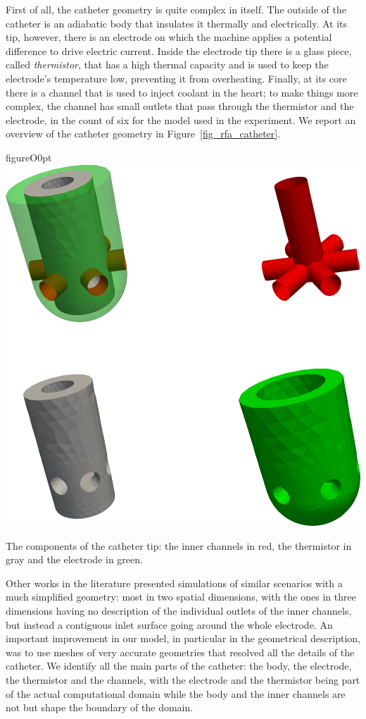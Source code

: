 First of all, the catheter geometry is quite complex in itself.
The outside of the catheter is an adiabatic body that insulates it thermally and electrically.
At its tip, however, there is an electrode on which the machine applies a potential difference to drive electric current.
Inside the electrode tip there is a glass piece, called \emph{thermistor}, that has a high thermal capacity and is used to keep the electrode's temperature low, preventing it from overheating.
Finally, at its core there is a channel that is used to inject coolant in the heart; to make things more complex, the channel has small outlets that pass through the thermistor and the electrode, in the count of six for the model used in the experiment.
We report an overview of the catheter geometry in Figure~\ref{fig_rfa_catheter}.
\begin{wrapfloat}{figure}{O}{0pt}
  \centering
    \includegraphics[width=0.5\columnwidth]{img/rfa/catheter}
    \caption{The components of the catheter tip: the inner channels in red, the thermistor in gray and the electrode in green.}
    \label{fig_rfa_catheter}
\end{wrapfloat}

Other works in the literature presented simulations of similar scenarios with a much simplified geometry: most in two spatial dimensions, with the ones in three dimensions having no description of the individual outlets of the inner channels, but instead a contiguous inlet surface going around the whole electrode.
An important improvement in our model, in particular in the geometrical description, was to use meshes of very accurate geometries that resolved all the details of the catheter.
We identify all the main parts of the catheter: the body, the electrode, the thermistor and the channels, with the electrode and the thermistor being part of the actual computational domain while the body and the inner channels are not but shape the boundary of the domain.

